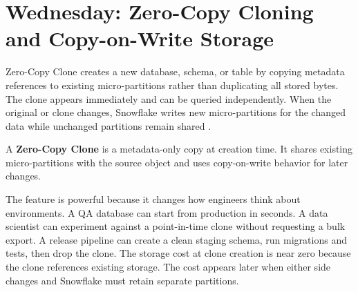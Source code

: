 \section{Wednesday: Zero-Copy Cloning and Copy-on-Write Storage}
Zero-Copy Clone creates a new database, schema, or table by copying metadata references to existing micro-partitions rather than duplicating all stored bytes. The clone appears immediately and can be queried independently. When the original or clone changes, Snowflake writes new micro-partitions for the changed data while unchanged partitions remain shared \cite{snowflakeCloneDocs}.
\begin{definitionbox}
A \textbf{Zero-Copy Clone} is a metadata-only copy at creation time. It shares existing micro-partitions with the source object and uses copy-on-write behavior for later changes.
\end{definitionbox}
The feature is powerful because it changes how engineers think about environments. A QA database can start from production in seconds. A data scientist can experiment against a point-in-time clone without requesting a bulk export. A release pipeline can create a clean staging schema, run migrations and tests, then drop the clone. The storage cost at clone creation is near zero because the clone references existing storage. The cost appears later when either side changes and Snowflake must retain separate partitions.
